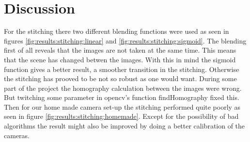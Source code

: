 \section{Discussion}
For the stitching there two different blending functions were used as seen in figures \ref{fig:results:stitching:linear} and \ref{fig:results:stitching:sigmoid}. The blending first of all reveals that the images are not taken at the same time. This means that the scene has changed betwen the images. With this in mind the sigmoid function gives a better result, a smoother transition in the stitching. Otherwise the stitching has prooved to be not so robust as one would want. During some part of the project the homography calculation between the images were wrong. But twitching some parameter in opencv's function findHomography fixed this. Then for our home made camera set-up the stitching performed quite poorly as seen in figure \ref{fig:results:stitching:homemade}. Except for the possibility of bad algorithms the result might also be improved by doing a better calibration of the cameras.
